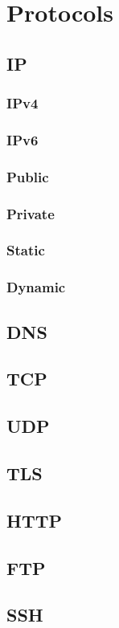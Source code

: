 \chapter{Protocols}%

\section{IP}

\subsection{IPv4}

\subsection{IPv6}

\subsection{Public}

\subsection{Private}

\subsection{Static}

\subsection{Dynamic}

\section{DNS}

\section{TCP}

\section{UDP}

\section{TLS}

\section{HTTP}

\section{FTP}

\section{SSH}

